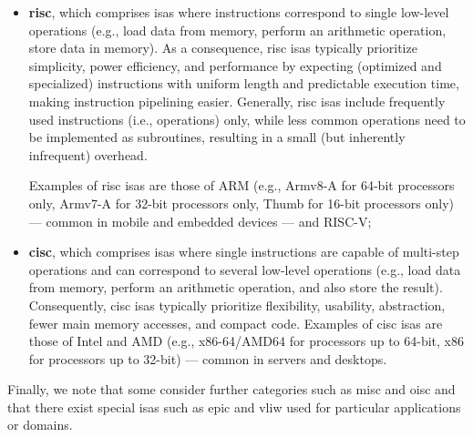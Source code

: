 \begin{itemize}
	
	\item \textbf{\gls{risc}}, which comprises \glspl{isa} where instructions correspond to single low-level operations (e.g., load data from memory, perform an arithmetic operation, store data in memory). As a consequence, \gls{risc} \glspl{isa} typically prioritize simplicity, power efficiency, and performance by expecting (optimized and specialized) instructions with uniform length and predictable execution time, making instruction pipelining easier. Generally, \gls{risc} \glspl{isa} include frequently used instructions (i.e., operations) only, while less common operations need to be implemented as subroutines, resulting in a small (but inherently infrequent) overhead.
	
	
	Examples of \gls{risc} \glspl{isa} are those of ARM (e.g., Armv8-A for 64-bit processors only, Armv7-A for 32-bit processors only, Thumb for 16-bit processors only) --- common in mobile and embedded devices --- and RISC-V;
	
	\item \textbf{\gls{cisc}}, which comprises \glspl{isa} where single instructions are capable of multi-step operations and can correspond to several low-level operations (e.g., load data from memory, perform an arithmetic operation, and also store the result). Consequently, \gls{cisc} \glspl{isa} typically prioritize flexibility, usability, abstraction, fewer main memory accesses, and compact code. Examples of \gls{cisc} \glspl{isa} are those of Intel and AMD (e.g., x86-64/AMD64 for processors up to 64-bit, x86 for processors up to 32-bit) --- common in servers and desktops.
	
\end{itemize}

Finally, we note that some consider further categories such as \gls{misc} and \gls{oisc} and that there exist special \glspl{isa} such as \gls{epic} and \gls{vliw} used for particular applications or domains.

